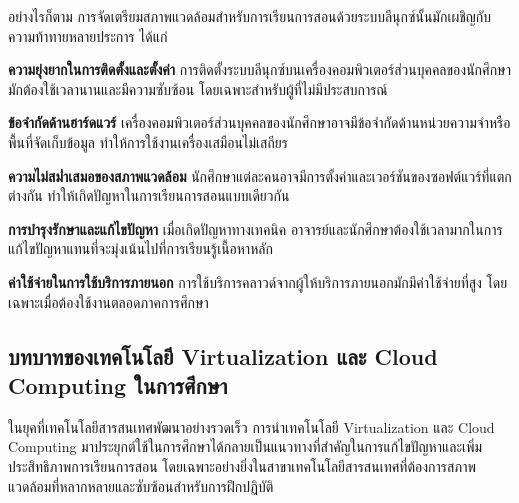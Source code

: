 \hspace*{1.3em} %
อย่างไรก็ตาม การจัดเตรียมสภาพแวดล้อมสำหรับการเรียนการสอนด้วยระบบลีนุกซ์นั้นมักเผชิญกับความท้าทายหลายประการ ได้แก่
\begin{mycustomitem}
    \item \textbf{ความยุ่งยากในการติดตั้งและตั้งค่า} การติดตั้งระบบลีนุกซ์บนเครื่องคอมพิวเตอร์ส่วนบุคคลของนักศึกษามักต้องใช้เวลานานและมีความซับซ้อน โดยเฉพาะสำหรับผู้ที่ไม่มีประสบการณ์
    \item \textbf{ข้อจำกัดด้านฮาร์ดแวร์} เครื่องคอมพิวเตอร์ส่วนบุคคลของนักศึกษาอาจมีข้อจำกัดด้านหน่วยความจำหรือพื้นที่จัดเก็บข้อมูล ทำให้การใช้งานเครื่องเสมือนไม่เสถียร
    \item \textbf{ความไม่สม่ำเสมอของสภาพแวดล้อม} นักศึกษาแต่ละคนอาจมีการตั้งค่าและเวอร์ชันของซอฟต์แวร์ที่แตกต่างกัน ทำให้เกิดปัญหาในการเรียนการสอนแบบเดียวกัน
    \item \textbf{การบำรุงรักษาและแก้ไขปัญหา} เมื่อเกิดปัญหาทางเทคนิค อาจารย์และนักศึกษาต้องใช้เวลามากในการแก้ไขปัญหาแทนที่จะมุ่งเน้นไปที่การเรียนรู้เนื้อหาหลัก
    \item \textbf{ค่าใช้จ่ายในการใช้บริการภายนอก} การใช้บริการคลาวด์จากผู้ให้บริการภายนอกมักมีค่าใช้จ่ายที่สูง โดยเฉพาะเมื่อต้องใช้งานตลอดภาคการศึกษา
\end{mycustomitem}



\subsection{บทบาทของเทคโนโลยี Virtualization และ Cloud Computing ในการศึกษา}

\hspace*{1.3em} %
ในยุคที่เทคโนโลยีสารสนเทศพัฒนาอย่างรวดเร็ว การนำเทคโนโลยี Virtualization และ Cloud Computing มาประยุกต์ใช้ในการศึกษาได้กลายเป็นแนวทางที่สำคัญในการแก้ไขปัญหาและเพิ่มประสิทธิภาพการเรียนการสอน โดยเฉพาะอย่างยิ่งในสาขาเทคโนโลยีสารสนเทศที่ต้องการสภาพแวดล้อมที่หลากหลายและซับซ้อนสำหรับการฝึกปฏิบัติ \parencite{clark2016blended}

